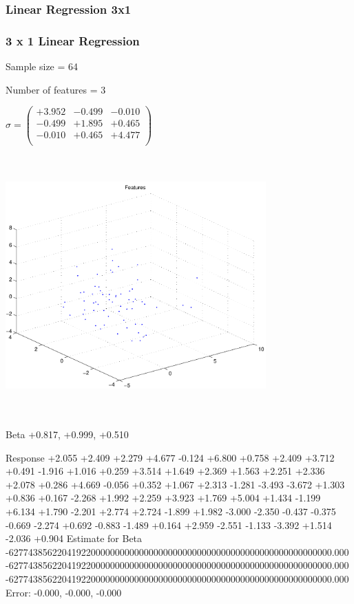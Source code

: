 \documentclass[9pt]{article}
\theoremstyle{plain}
\theoremstyle{definition}
\theoremstyle{remark}
\numberwithin{equation}{section}
\begin{document}
\subsubsection{Linear Regression 3x1}
\subsubsection{3 x 1 Linear Regression}
Sample size = 64

Number of features = 3

$\sigma = \left(
\begin{array}{
ccc}
+3.952 & -0.499 & -0.010 \\
-0.499 & +1.895 & +0.465 \\
-0.010 & +0.465 & +4.477 \\
\end{array}
\right)$ \newline 

\includegraphics[width=10.0cm,height=10.0cm]{regression_features.pdf}

Beta
+0.817, +0.999, +0.510

Response
+2.055
+2.409
+2.279
+4.677
-0.124
+6.800
+0.758
+2.409
+3.712
+0.491
-1.916
+1.016
+0.259
+3.514
+1.649
+2.369
+1.563
+2.251
+2.336
+2.078
+0.286
+4.669
-0.056
+0.352
+1.067
+2.313
-1.281
-3.493
-3.672
+1.303
+0.836
+0.167
-2.268
+1.992
+2.259
+3.923
+1.769
+5.004
+1.434
-1.199
+6.134
+1.790
-2.201
+2.774
+2.724
-1.899
+1.982
-3.000
-2.350
-0.437
-0.375
-0.669
-2.274
+0.692
-0.883
-1.489
+0.164
+2.959
-2.551
-1.133
-3.392
+1.514
-2.036
+0.904
Estimate for Beta
-6277438562204192200000000000000000000000000000000000000000000000000.000
-6277438562204192200000000000000000000000000000000000000000000000000.000
-6277438562204192200000000000000000000000000000000000000000000000000.000
Error:
-0.000, -0.000, -0.000
\end{document}
